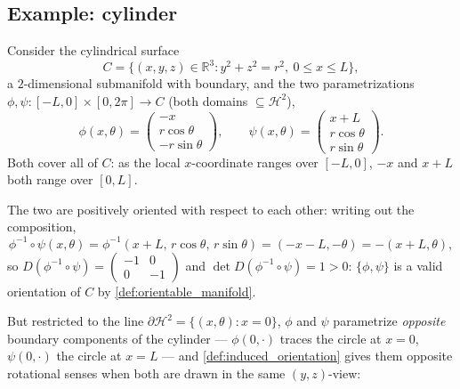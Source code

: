 \subsection{Example: cylinder}
\label{sec:cylinder_orientation_example}

Consider the cylindrical surface
\[C = \{(x,y,z) \in \mathbb{R}^3 : y^2+z^2 = r^2,\ 0\leq x\leq L\},\]
a $2$-dimensional submanifold with boundary, and the two parametrizations $\phi,\psi :
[-L,0]\times[0,2\pi] \to C$ (both domains $\subseteq \mathcal{H}^2$),
\[\phi(x,\theta) = \begin{pmatrix} -x \\ r\cos\theta \\ -r\sin\theta \end{pmatrix}, \qquad
  \psi(x,\theta) = \begin{pmatrix} x+L \\ r\cos\theta \\ r\sin\theta \end{pmatrix}.\]
Both cover all of $C$: as the local $x$-coordinate ranges over $[-L,0]$, $-x$ and $x+L$ both
range over $[0,L]$.

The two are positively oriented with respect to each other: writing out the composition,
\[\phi^{-1}\circ\psi(x,\theta) = \phi^{-1}(x+L,\,r\cos\theta,\,r\sin\theta) = (-x-L,-\theta)
  = -(x+L,\theta),\]
so $D(\phi^{-1}\circ\psi) = \begin{pmatrix}-1&0\\0&-1\end{pmatrix}$ and $\det D(\phi^{-1}
\circ\psi) = 1 > 0$: $\{\phi,\psi\}$ is a valid orientation of $C$ by
\cref{def:orientable_manifold}.

But restricted to the line $\partial\mathcal{H}^2 = \{(x,\theta) : x=0\}$, $\phi$ and $\psi$
parametrize \emph{opposite} boundary components of the cylinder --- $\phi(0,\cdot)$ traces the
circle at $x=0$, $\psi(0,\cdot)$ the circle at $x=L$ --- and \cref{def:induced_orientation}
gives them opposite rotational senses when both are drawn in the same $(y,z)$-view:

\begin{center}
\end{center}


